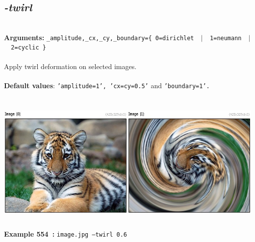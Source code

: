 \documentclass[a4paper,11pt,twoside]{book}
\begin{document}
\subsection{\emph{-twirl} }\vspace*{-0.5em}
~\\\textbf{Arguments: } 
{\small \texttt{\_amplitude,\_cx,\_cy,\_boundary=\{ 0=dirichlet ~$|$~ 1=neumann ~$|$~ 2=cyclic \}}}\\~\\
Apply twirl deformation on selected images.
~\\~\\\textbf{Default values}: {\small \texttt{'amplitude=1', 'cx=cy=0.5'} and \texttt{'boundary=1'.}}
\begin{center}\includegraphics[keepaspectratio=true,height=7cm,width=\textwidth]{img/gmic_def554.jpg}\\
{\footnotesize \textbf{Example 554~:} \texttt{image.jpg --twirl 0.6}}
\end{center}
\end{document}

